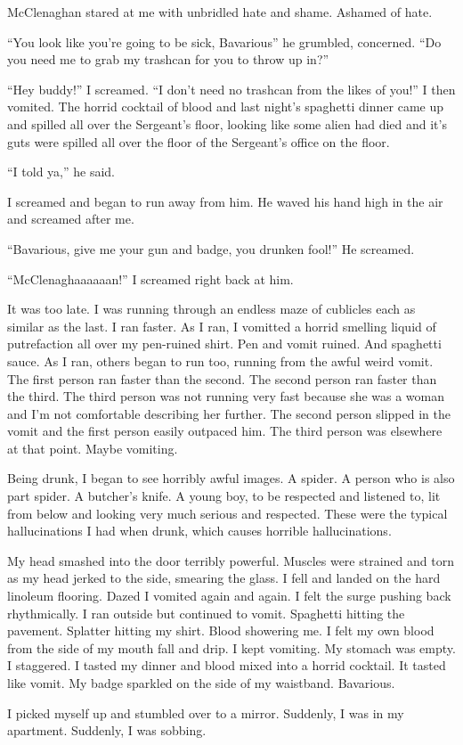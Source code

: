 McClenaghan stared at me with unbridled hate and shame. Ashamed of
hate.

``You look like you're going to be sick, Bavarious'' he grumbled,
concerned. ``Do you need me to grab my trashcan for you to throw up
in?''

``Hey buddy!'' I screamed. ``I don't need no trashcan from the likes
of you!'' I then vomited. The horrid cocktail of blood and last
night's spaghetti dinner came up and spilled all over the
Sergeant's floor, looking like some alien had died and it's guts
were spilled all over the floor of the Sergeant's office on the
floor.

``I told ya,'' he said.

I screamed and began to run away from him. He waved his hand high
in the air and screamed after me.

``Bavarious, give me your gun and badge, you drunken fool!'' He
screamed.

``McClenaghaaaaaan!'' I screamed right back at him.

It was too late. I was running through an endless maze of cublicles
each as similar as the last. I ran faster. As I ran, I vomitted a
horrid smelling liquid of putrefaction all over my pen-ruined
shirt. Pen and vomit ruined. And spaghetti sauce. As I ran, others
began to run too, running from the awful weird vomit. The first
person ran faster than the second. The second person ran faster
than the third. The third person was not running very fast because
she was a woman and I'm not comfortable describing her further. The
second person slipped in the vomit and the first person easily
outpaced him. The third person was elsewhere at that point. Maybe
vomiting.

Being drunk, I began to see horribly awful images. A spider. A
person who is also part spider. A butcher's knife. A young boy, to
be respected and listened to, lit from below and looking very much
serious and respected. These were the typical hallucinations I had
when drunk, which causes horrible hallucinations.

My head smashed into the door terribly powerful. Muscles were
strained and torn as my head jerked to the side, smearing the
glass. I fell and landed on the hard linoleum flooring. Dazed I
vomited again and again. I felt the surge pushing back
rhythmically. I ran outside but continued to vomit. Spaghetti
hitting the pavement. Splatter hitting my shirt. Blood showering
me. I felt my own blood from the side of my mouth fall and drip. I
kept vomiting. My stomach was empty. I staggered. I tasted my
dinner and blood mixed into a horrid cocktail. It tasted like
vomit. My badge sparkled on the side of my waistband.
Bavarious.

I picked myself up and stumbled over to a mirror. Suddenly, I was
in my apartment. Suddenly, I was sobbing. 

 



